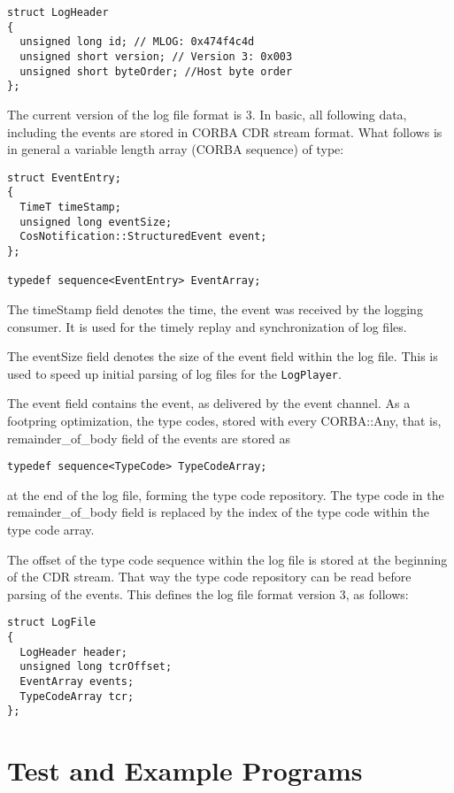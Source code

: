 \begin{lstlisting}
struct LogHeader
{
  unsigned long id; // MLOG: 0x474f4c4d
  unsigned short version; // Version 3: 0x003
  unsigned short byteOrder; //Host byte order
};
\end{lstlisting}

The current version of the log file format is 3. In basic, all
following data, including the events are stored in CORBA CDR stream
format. What follows is in general a variable length array (CORBA
sequence) of type:

\begin{lstlisting}
struct EventEntry;
{
  TimeT timeStamp;
  unsigned long eventSize;
  CosNotification::StructuredEvent event;
};

typedef sequence<EventEntry> EventArray;
\end{lstlisting}

The timeStamp field denotes the time, the event was received by the
logging consumer. It is used for the timely replay and synchronization
of log files. 

The eventSize field denotes the size of the event field within the log
file. This is used to speed up initial parsing of log files for the
\texttt{LogPlayer}. 

The event field contains the event, as delivered by the event channel.
As a footpring optimization, the type codes, stored with every
CORBA::Any, that is, remainder\_of\_body field of the events are stored as

\begin{lstlisting}
typedef sequence<TypeCode> TypeCodeArray;
\end{lstlisting}

at the end of the log file, forming the type code repository. The type
code in the remainder\_of\_body field is replaced by the index of the
type code within the type code array.

The offset of the type code sequence within the log file is stored at
the beginning of the CDR stream. That way the type code repository can
be read before parsing of the events. This defines the log file
format version 3, as follows:

\begin{lstlisting}
struct LogFile
{
  LogHeader header;
  unsigned long tcrOffset;
  EventArray events;
  TypeCodeArray tcr;
};
\end{lstlisting}

\section{Test and Example Programs}

